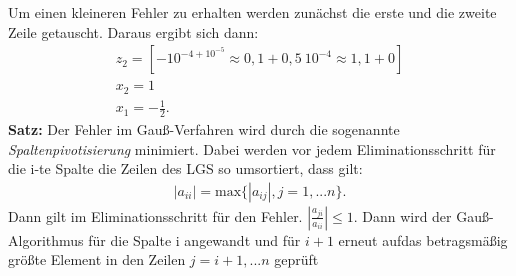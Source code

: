 \documentclass{scrartcl}
\begin{document}
Um einen kleineren Fehler zu erhalten werden zunächst die erste und die zweite Zeile getauscht. Daraus ergibt sich dann:
\begin{align*}
z_2=[-10^{-4+10^{-5}} \approx 0,1+0,5\ 10^{-4} \approx 1, 1+0]\\
x_2=1 \\
x_1=- \frac{1}{2}.
\end{align*}
\textbf{Satz:} Der Fehler im Gauß-Verfahren wird durch die sogenannte \textit{Spaltenpivotisierung} minimiert. Dabei werden vor jedem Eliminationsschritt für die i-te Spalte die Zeilen des LGS so umsortiert, dass gilt:
\begin{align*}
|a_{ii}|= \text{max}\{|a_{ij}|, j=1,...n \}.
\end{align*}
Dann gilt im Eliminationsschritt für den Fehler. $|\frac{a_{ji}}{a_{ii}}|\leq 1$.
Dann wird der Gauß-Algorithmus für die Spalte i angewandt und für $i+1$ erneut aufdas betragsmäßig größte Element in den Zeilen $j=i+1,...n$
geprüft
\end{document}
